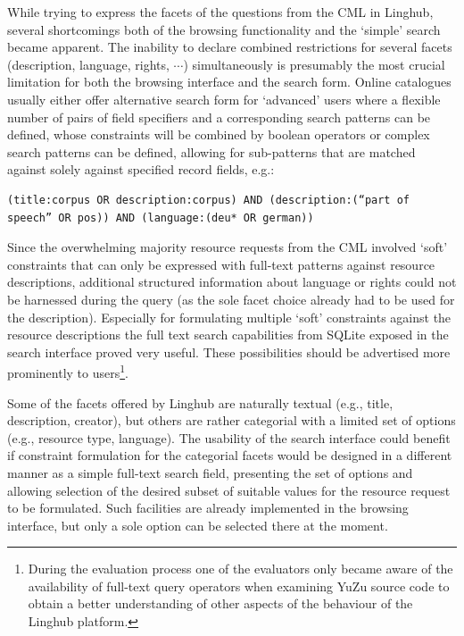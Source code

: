 \documentclass[smallextended]{svjour3}       %
\begin{document}
While trying to express the facets of the questions from the CML in Linghub,
several shortcomings both of the browsing functionality and the `simple' search
became apparent. 
The inability to declare combined restrictions for several facets (description,
language, rights, $\cdots$) simultaneously is presumably the most crucial limitation
for both the browsing interface and the search form. Online catalogues usually
either offer alternative search form for `advanced' users where a flexible
number of pairs of field specifiers and a corresponding search patterns can be
defined, whose constraints will be combined by boolean operators or complex
search patterns can be defined, allowing for sub-patterns that are matched
against solely against specified record fields, e.g.:

\begin{verbatim}
(title:corpus OR description:corpus) AND (description:(“part of speech” OR pos)) AND (language:(deu* OR german))
\end{verbatim}

Since the overwhelming majority resource requests from the CML involved ‘soft’
constraints that can only be expressed with full-text patterns against resource
descriptions, additional structured information about language or rights could
not be harnessed during the query (as the sole facet choice already had to be
used for the description). Especially for formulating multiple ‘soft’
constraints against the resource descriptions the full text search capabilities
from SQLite exposed in the search interface proved very useful. These
possibilities should be advertised more prominently to users\footnote{
    During the evaluation process one of the evaluators only became aware of the
    availability of full-text query operators when examining YuZu source code to
    obtain a better understanding of other aspects of the behaviour of the
Linghub platform.}.  

Some of the facets offered by Linghub are naturally textual (e.g., title,
description, creator), but others are rather categorial with a limited set of
options (e.g., resource type, language). The usability of the search interface
could benefit if constraint formulation for the categorial facets would be
designed in a different manner as a simple full-text search field, presenting
the set of options and allowing selection of the desired subset of suitable
values for the resource request to be formulated. Such facilities are already
implemented in the browsing interface, but only a sole option can be selected
there at the moment.  
\end{document}
